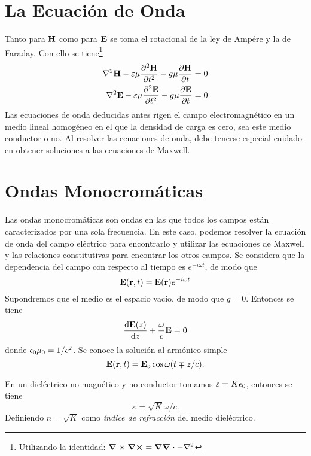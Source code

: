 \section{La Ecuación de Onda}
Tanto para $\vb{H}$ como para $\vb{E}$ se toma el rotacional de la ley de Ampére y la de Faraday. Con ello se tiene\footnote{Utilizando la identidad: $\curl{\curl} = \grad{\div} - \laplacian$}
\begin{align}
    \laplacian{\vb{H}} - \varepsilon \mu \pdv[2]{\vb{H}}{t} - g\mu \pdv{\vb{H}}{t} &= 0 \\
    \laplacian{\vb{E}} - \varepsilon \mu \pdv[2]{\vb{E}}{t} - g\mu \pdv{\vb{E}}{t} &= 0
\end{align}
Las ecuaciones de onda deducidas antes rigen el campo electromagnético en un medio lineal homogéneo en el que la densidad de carga es cero, sea este medio conductor o no. Al resolver las ecuaciones de onda, debe tenerse especial cuidado en obtener soluciones a las ecuaciones de Maxwell.

\section{Ondas Monocromáticas}
Las ondas monocromáticas son ondas en las que todos los campos están caracterizados por una sola frecuencia. En este caso, podemos resolver la ecuación de onda del campo eléctrico para encontrarlo y utilizar las ecuaciones de Maxwell y las relaciones constitutivas para encontrar los otros campos. Se considera que la dependencia del campo con respecto al tiempo es $e^{-i\omega t}$, de modo que
\begin{equation}
    \vb{E} (\vb{r},t) = \vb{E} (\vb{r}) e^{-i\omega t}
\end{equation}
Supondremos que el medio es el espacio vacío, de modo que $g=0$. Entonces se tiene
\begin{equation}
    \dv{\vb{E} (z)}{z} + \frac{\omega}{c} \vb{E} = 0
\end{equation}
donde $\epsilon_0 \mu_0 = 1/c^2$. Se conoce la solución al armónico simple
\begin{equation}
    \vb{E} (\vb{r} ,t) = \vb{E}_o \cos{\omega (t \mp z/c)}.
\end{equation}

En un dieléctrico no magnético y no conductor tomamos $\varepsilon = K\epsilon_0$, entonces se tiene
\begin{equation}
    \kappa = \sqrt{K} \omega/c.
\end{equation}
Definiendo $n = \sqrt{K}$ como \textit{índice de refracción} del medio dieléctrico.

